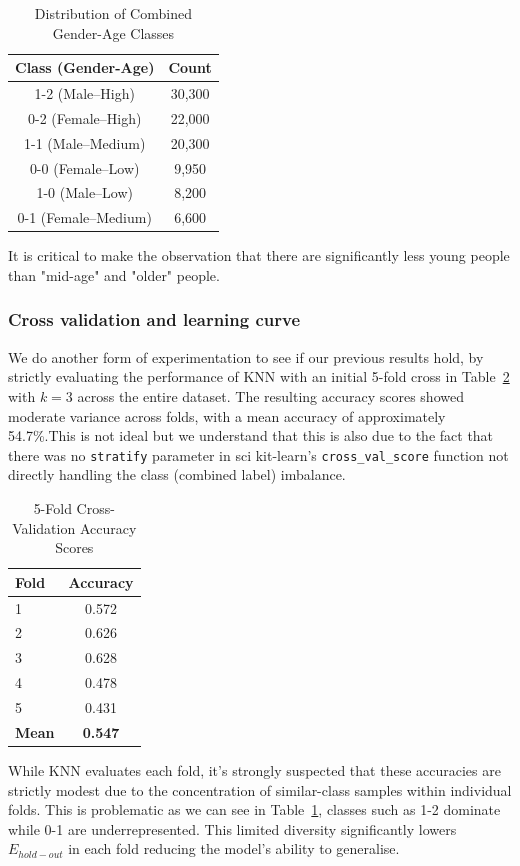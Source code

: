 \documentclass[10pt,twocolumn]{article}
\begin{document}
\begin{table}[H]
\centering
\caption{Distribution of Combined Gender-Age Classes}
\begin{tabular}{|c|c|}
\hline
\textbf{Class (Gender-Age)} & \textbf{Count} \\
\hline
1-2 (Male–High)   & 30,300 \\
0-2 (Female–High) & 22,000 \\
1-1 (Male–Medium) & 20,300 \\
0-0 (Female–Low)  & 9,950 \\
1-0 (Male–Low)    & 8,200 \\
0-1 (Female–Medium) & 6,600 \\
\hline
\end{tabular}
\label{tab:combined-class-distribution}
\end{table}
It is critical to make the observation that there are significantly less young people than "mid-age" and "older" people.

\clearpage  %
\subsubsection{Cross validation and learning curve}
We do another form of experimentation to see if our previous results hold, by strictly evaluating the performance of KNN with an initial 5-fold cross in Table~\ref{tab:cv-scores} with $k=3$ across the entire dataset. The resulting accuracy scores showed moderate variance across folds, with a mean accuracy of approximately 54.7\%.This is not ideal but we understand that this is also due to the fact that there was no \texttt{stratify} parameter in sci kit-learn's \texttt{cross\_val\_score} function not directly handling the class (combined label) imbalance.
\begin{table}[H]
\centering
\caption{5-Fold Cross-Validation Accuracy Scores}
\begin{tabular}{lc}
\hline
\textbf{Fold} & \textbf{Accuracy} \\
\hline
1 & 0.572 \\
2 & 0.626 \\
3 & 0.628 \\
4 & 0.478 \\
5 & 0.431 \\
\hline
\textbf{Mean} & \textbf{0.547} \\
\hline
\end{tabular}
\label{tab:cv-scores}
\end{table}
While KNN evaluates each fold, it's strongly suspected that these accuracies are strictly modest due to the concentration of similar-class samples within individual folds.  This is problematic as we can see in Table~\ref{tab:combined-class-distribution}, classes such as 1-2 dominate while 0-1 are underrepresented. This limited diversity significantly lowers $E_{hold-out}$ in each fold reducing the model's ability to generalise.
\end{document}

